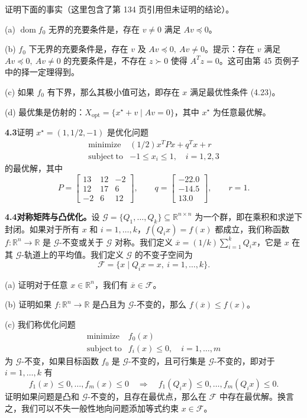 \documentclass[UTF8, 12pt, fontset=fandol, oneside]{ctexart}
\begin{document}
证明下面的事实（这里包含了第 134 页引用但未证明的结论）。

(a) $\operatorname{dom} f_0$ 无界的充要条件是，存在 $v\neq0$ 满足 $Av\preceq0$。

(b) $f_0$ 下无界的充要条件是，存在 $v$ 及 $Av\preceq0,\ Av\neq0$。提示：存在 $v$ 满足 $Av\preceq0,\ Av\neq0$ 的充要条件是，不存在 $z\succ0$ 使得 $A^Tz=0$。这可由第 45 页例子中的择一定理得到。

(c) 如果 $f_0$ 有下界，那么其极小值可达，即存在 $x$ 满足最优性条件 (4.23)。

(d) 最优集是仿射的：$X_{\mathrm{opt}}=\{x^\star+v\mid Av=0\}$，其中 $x^\star$ 为任意最优解。

\noindent\textbf{4.3}\quad 证明 $x^\star=(1,1/2,-1)$ 是优化问题
\[
\begin{array}{ll}
\mathop{\mathrm{minimize}} & (1/2)x^TPx+q^Tx+r\\
\mathrm{subject\ to} & -1\leq x_i\leq1,\quad i=1,2,3
\end{array}
\]
的最优解，其中
\[
P=\begin{bmatrix}
13 & 12 & -2\\
12 & 17 & 6\\
-2 & 6 & 12
\end{bmatrix},
\qquad
q=\begin{bmatrix}
-22.0\\
-14.5\\
13.0
\end{bmatrix},
\qquad
r=1.
\]

\noindent\textbf{4.4\quad [P. Parrilo] 对称矩阵与凸优化。}\quad 设 $\mathcal{G}=\{Q_1,\ldots,Q_k\}\subseteq\mathbb{R}^{n\times n}$ 为一个群，即在乘积和求逆下封闭。如果对于所有 $x$ 和 $i=1,\ldots,k$，$f(Q_ix)=f(x)$ 都成立，我们称函数 $f:\mathbb{R}^n\to\mathbb{R}$ 是 $\mathcal{G}$-不变或关于 $\mathcal{G}$ 对称。我们定义 $\overline{x}=(1/k)\sum_{i=1}^k Q_ix$，它是 $x$ 在其 $\mathcal{G}$-轨道上的平均值。我们定义 $\mathcal{G}$ 的不变子空间为
\[
\mathcal{F}=\{x\mid Q_ix=x,\ i=1,\ldots,k\}.
\]

(a) 证明对于任意 $x\in\mathbb{R}^n$，我们有 $\overline{x}\in\mathcal{F}$。

(b) 证明如果 $f:\mathbb{R}^n\to\mathbb{R}$ 是凸且为 $\mathcal{G}$-不变的，那么 $f(\overline{x})\leq f(x)$。

(c) 我们称优化问题
\[
\begin{array}{ll}
\mathop{\mathrm{minimize}} & f_0(x)\\
\mathrm{subject\ to} & f_i(x)\leq0,\quad i=1,\ldots,m
\end{array}
\]
为 $\mathcal{G}$-不变，如果目标函数 $f_0$ 是 $\mathcal{G}$-不变的，且可行集是 $\mathcal{G}$-不变的，即对于 $i=1,\ldots,k$ 有
\[
f_1(x)\leq0,\ldots,f_m(x)\leq0
\quad\Longrightarrow\quad
f_1(Q_ix)\leq0,\ldots,f_m(Q_ix)\leq0.
\]
证明如果问题是凸和 $\mathcal{G}$-不变的，且存在最优点，那么在 $\mathcal{F}$ 中存在最优解。换言之，我们可以不失一般性地向问题添加等式约束 $x\in\mathcal{F}$。
\end{document}
